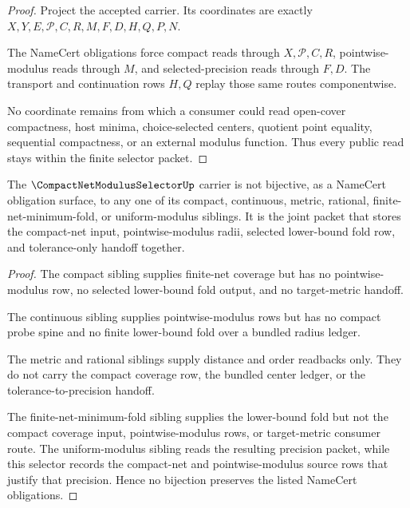 \begin{proof}
Project the accepted carrier. Its coordinates are exactly $X,Y,E,\mathcal{P},C,R,M,F,D,H,Q,P,N$.

The NameCert obligations force compact reads through $X,\mathcal{P},C,R$, pointwise-modulus reads through $M$, and selected-precision reads through $F,D$. The transport and continuation rows $H,Q$ replay those same routes componentwise.

No coordinate remains from which a consumer could read open-cover compactness, host minima, choice-selected centers, quotient point equality, sequential compactness, or an external modulus function. Thus every public read stays within the finite selector packet.
\end{proof}

\begin{theorem}
\label{thm:compact-net-modulus-selector-independence-boundary}
The $\CompactNetModulusSelectorUp$ carrier is not bijective, as a NameCert obligation surface, to any one of its compact, continuous, metric, rational, finite-net-minimum-fold, or uniform-modulus siblings. It is the joint packet that stores the compact-net input, pointwise-modulus radii, selected lower-bound fold row, and tolerance-only handoff together.
\end{theorem}

\begin{proof}
The compact sibling supplies finite-net coverage but has no pointwise-modulus row, no selected lower-bound fold output, and no target-metric handoff.

The continuous sibling supplies pointwise-modulus rows but has no compact probe spine and no finite lower-bound fold over a bundled radius ledger.

The metric and rational siblings supply distance and order readbacks only. They do not carry the compact coverage row, the bundled center ledger, or the tolerance-to-precision handoff.

The finite-net-minimum-fold sibling supplies the lower-bound fold but not the compact coverage input, pointwise-modulus rows, or target-metric consumer route. The uniform-modulus sibling reads the resulting precision packet, while this selector records the compact-net and pointwise-modulus source rows that justify that precision. Hence no bijection preserves the listed NameCert obligations.
\end{proof}


